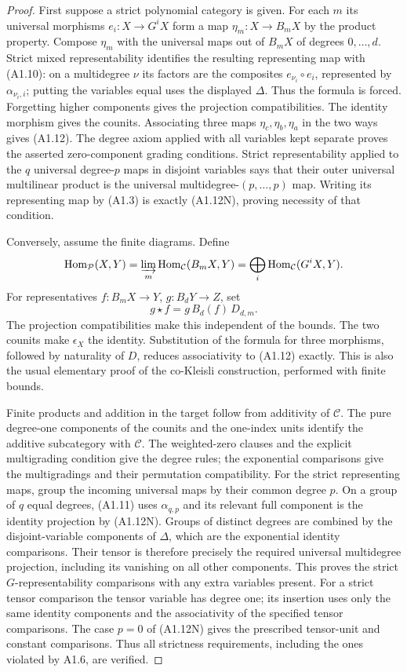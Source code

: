 \begin{proof}
First suppose a strict polynomial category is given. For each $m$ its
universal morphisms $e_i:X\to G^iX$ form a map
$\eta_m:X\to B_mX$ by the product property. Compose $\eta_m$ with
the universal maps out of $B_mX$ of degrees $0,\ldots,d$.
Strict mixed representability identifies the resulting representing
map with (A1.10): on a multidegree $\nu$ its factors are the composites
$e_{\nu_i}\circ e_i$, represented by $\alpha_{\nu_i,i}$; putting the
variables equal uses the displayed $\Delta$. Thus the formula is
forced. Forgetting higher components gives the projection
compatibilities. The identity morphism gives the counits. Associating
three maps $\eta_c,\eta_b,\eta_a$ in the two ways gives (A1.12).
The degree axiom applied with all variables kept separate proves
the asserted zero-component grading conditions. Strict representability
applied to the $q$ universal degree-$p$ maps in disjoint variables
says that their outer universal multilinear product is the universal
multidegree-$(p,\ldots,p)$ map. Writing its representing map by
(A1.3) is exactly (A1.12N), proving necessity of that condition.

Conversely, assume the finite diagrams. Define
\[
 \operatorname{Hom}_{\mathcal P}(X,Y)
   =\varinjlim_m\operatorname{Hom}_{\mathcal C}(B_mX,Y)
   =\bigoplus_i\operatorname{Hom}_{\mathcal C}(G^iX,Y).
\]
For representatives $f:B_mX\to Y$, $g:B_dY\to Z$, set
\[
       g\star f=g\,B_d(f)\,D_{d,m}.
\]
The projection compatibilities make this independent of the bounds.
The two counits make $\epsilon_X$ the identity. Substitution of the
formula for three morphisms, followed by naturality of $D$, reduces
associativity to (A1.12) exactly. This is also the usual elementary
proof of the co-Kleisli construction, performed with finite bounds.

Finite products and addition in the target follow from additivity of
$\mathcal C$. The pure degree-one components of the counits and the
one-index units identify the additive subcategory with $\mathcal C$.
The weighted-zero clauses and the explicit multigrading condition
give the degree rules; the exponential comparisons give the
multigradings and their permutation compatibility. For the strict
representing maps, group the incoming universal maps by their common
degree $p$. On a group of $q$ equal degrees, (A1.11) uses
$\alpha_{q,p}$ and its relevant full component is the identity
projection by (A1.12N). Groups of distinct degrees are combined by
the disjoint-variable components of $\Delta$, which are the
exponential identity comparisons. Their tensor is therefore precisely
the required universal multidegree projection, including its
vanishing on all other components. This proves the strict
$G$-representability comparisons with any extra variables present.
For a strict tensor comparison the tensor variable has degree one;
its insertion uses only the same identity components and the
associativity of the specified tensor comparisons. The case $p=0$
of (A1.12N) gives the prescribed tensor-unit and constant comparisons.
Thus all strictness requirements, including the ones violated by
A1.6, are verified.


\end{proof}
